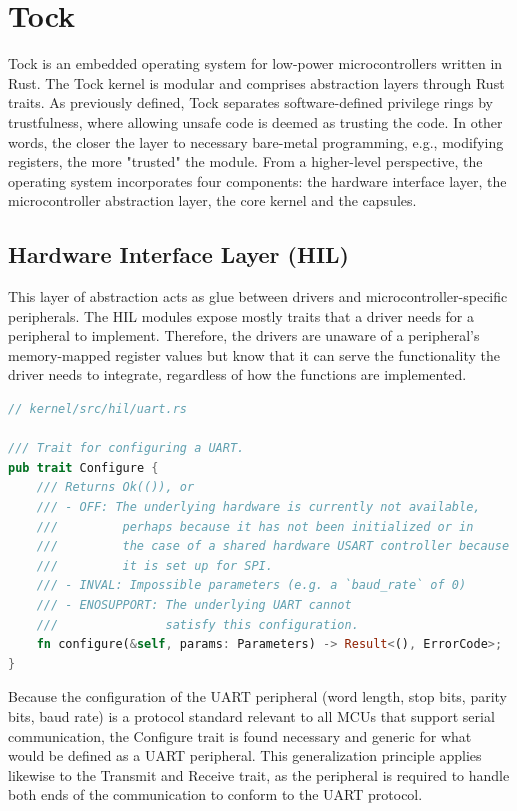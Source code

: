 \documentclass[12pt,a4paper]{report}
\begin{document}
\section{Tock}

Tock is an embedded operating system for low-power microcontrollers written in Rust. The Tock kernel is modular and comprises abstraction layers through Rust traits. As previously defined, Tock separates software-defined privilege rings by trustfulness, where allowing unsafe code is deemed as trusting the code. In other words, the closer the layer to necessary bare-metal programming, e.g., modifying registers, the more "trusted" the module. From a higher-level perspective, the operating system incorporates four components: the hardware interface layer, the microcontroller abstraction layer, the core kernel and the capsules.

\newpage
\subsection{Hardware Interface Layer (HIL)}

This layer of abstraction acts as glue between drivers and microcontroller-specific peripherals. The HIL modules expose mostly traits that a driver needs for a peripheral to implement. Therefore, the drivers are unaware of a peripheral's memory-mapped register values but know that it can serve the functionality the driver needs to integrate, regardless of how the functions are implemented.

\begin{lstlisting}[caption={Trait for configuring UART peripherals},label={lst:cfg-trait},language=Rust]
// kernel/src/hil/uart.rs

/// Trait for configuring a UART.
pub trait Configure {
    /// Returns Ok(()), or
    /// - OFF: The underlying hardware is currently not available,
    ///         perhaps because it has not been initialized or in
    ///         the case of a shared hardware USART controller because
    ///         it is set up for SPI.
    /// - INVAL: Impossible parameters (e.g. a `baud_rate` of 0)
    /// - ENOSUPPORT: The underlying UART cannot
    ///               satisfy this configuration.
    fn configure(&self, params: Parameters) -> Result<(), ErrorCode>;
}
\end{lstlisting}

Because the configuration of the UART peripheral (word length, stop bits, parity bits, baud rate) is a protocol standard relevant to all MCUs that support serial communication, the Configure trait is found necessary and generic for what would be defined as a UART peripheral. This generalization principle applies likewise to the Transmit and Receive trait, as the peripheral is required to handle both ends of the communication to conform to the UART protocol.
\end{document}
